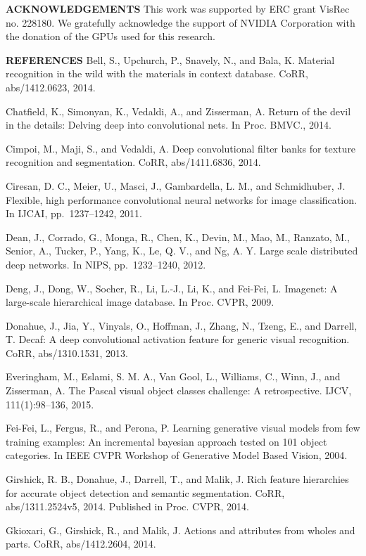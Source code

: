 \documentclass[12pt,a4paper,UTF8,twoside]{book}
\begin{document}
\textbf{ACKNOWLEDGEMENTS}
This work was supported by ERC grant VisRec no. 228180. We gratefully acknowledge the support of NVIDIA Corporation with the donation of the GPUs used for this research.

\textbf{REFERENCES}
Bell, S., Upchurch, P., Snavely, N., and Bala, K. Material recognition in the wild with the materials in context database. CoRR, abs/1412.0623, 2014.

Chatfield, K., Simonyan, K., Vedaldi, A., and Zisserman, A. Return of the devil in the details: Delving deep into convolutional nets. In Proc. BMVC., 2014.

Cimpoi, M., Maji, S., and Vedaldi, A. Deep convolutional filter banks for texture recognition and segmentation. CoRR, abs/1411.6836, 2014.

Ciresan, D. C., Meier, U., Masci, J., Gambardella, L. M., and Schmidhuber, J. Flexible, high performance convolutional neural networks for image classification. In IJCAI, pp.~1237--1242, 2011.

Dean, J., Corrado, G., Monga, R., Chen, K., Devin, M., Mao, M., Ranzato, M., Senior, A., Tucker, P., Yang, K., Le, Q. V., and Ng, A. Y. Large scale distributed deep networks. In NIPS, pp.~1232--1240, 2012.

Deng, J., Dong, W., Socher, R., Li, L.-J., Li, K., and Fei-Fei, L. Imagenet: A large-scale hierarchical image database. In Proc. CVPR, 2009.

Donahue, J., Jia, Y., Vinyals, O., Hoffman, J., Zhang, N., Tzeng, E., and Darrell, T. Decaf: A deep convolutional activation feature for generic visual recognition. CoRR, abs/1310.1531, 2013.

Everingham, M., Eslami, S. M. A., Van Gool, L., Williams, C., Winn, J., and Zisserman, A. The Pascal visual object classes challenge: A retrospective. IJCV, 111(1):98--136, 2015.

Fei-Fei, L., Fergus, R., and Perona, P. Learning generative visual models from few training examples: An incremental bayesian approach tested on 101 object categories. In IEEE CVPR Workshop of Generative Model Based Vision, 2004.

Girshick, R. B., Donahue, J., Darrell, T., and Malik, J. Rich feature hierarchies for accurate object detection and semantic segmentation. CoRR, abs/1311.2524v5, 2014. Published in Proc. CVPR, 2014.

Gkioxari, G., Girshick, R., and Malik, J. Actions and attributes from wholes and parts. CoRR, abs/1412.2604, 2014.
\end{document}
